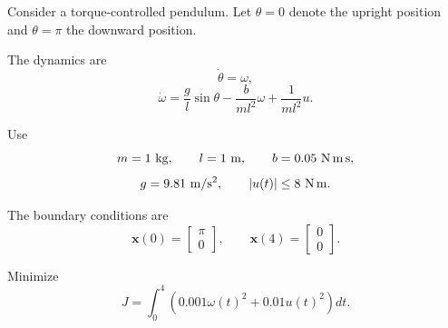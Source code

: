 Consider a torque-controlled pendulum. Let $\theta=0$ denote the upright
position and $\theta=\pi$ the downward position.

The dynamics are
\begin{equation}
\dot{\theta}=\omega,
\end{equation}
\begin{equation}
\dot{\omega}
=
\frac{g}{l}\sin\theta
-
\frac{b}{ml^2}\omega
+
\frac{1}{ml^2}u.
\end{equation}

Use
\begin{equation}
m=1\ {\rm kg},
\qquad
l=1\ {\rm m},
\qquad
b=0.05\ {\rm N\,m\,s},
\end{equation}
\begin{equation}
g=9.81\ {\rm m/s^2},
\qquad
|u(t)|\leq8\ {\rm N\,m}.
\end{equation}

The boundary conditions are
\begin{equation}
\mathbf{x}(0)=
\begin{bmatrix}
\pi\\
0
\end{bmatrix},
\qquad
\mathbf{x}(4)=
\begin{bmatrix}
0\\
0
\end{bmatrix}.
\end{equation}

Minimize
\begin{equation}
J=
\int_0^4
\left(
0.001\omega(t)^2
+
0.01u(t)^2
\right)dt.
\end{equation}

